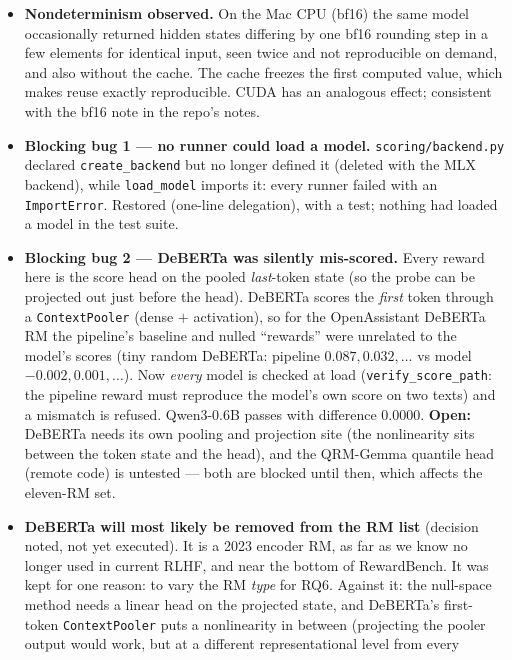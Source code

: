 \documentclass{article}
\begin{document}
\begin{itemize}
        removed, so every swept cell re-ran the model 5 more times.
  \item \textbf{Nondeterminism observed.} On the Mac CPU (bf16) the same model occasionally returned hidden
        states differing by one bf16 rounding step in a few elements for identical input, seen twice and not
        reproducible on demand, and also without the cache. The cache freezes the first computed value, which
        makes reuse exactly reproducible. CUDA has an analogous effect; consistent with the bf16 note in the
        repo's notes.
  \item \textbf{Blocking bug 1 --- no runner could load a model.} \texttt{scoring/backend.py} declared
        \texttt{create\_backend} but no longer defined it (deleted with the MLX backend), while
        \texttt{load\_model} imports it: every runner failed with an \texttt{ImportError}. Restored (one-line
        delegation), with a test; nothing had loaded a model in the test suite.
  \item \textbf{Blocking bug 2 --- DeBERTa was silently mis-scored.} Every reward here is the score head on the
        pooled \emph{last}-token state (so the probe can be projected out just before the head). DeBERTa scores
        the \emph{first} token through a \texttt{ContextPooler} (dense $+$ activation), so for the
        OpenAssistant DeBERTa RM the pipeline's baseline and nulled ``rewards'' were unrelated to the model's
        scores (tiny random DeBERTa: pipeline $0.087, 0.032, \dots$ vs model $-0.002, 0.001, \dots$). Now
        \emph{every} model is checked at load (\texttt{verify\_score\_path}: the pipeline reward must reproduce
        the model's own score on two texts) and a mismatch is refused. Qwen3-0.6B passes with difference
        0.0000. \textbf{Open:} DeBERTa needs its own pooling and projection site (the nonlinearity sits between
        the token state and the head), and the QRM-Gemma quantile head (remote code) is untested --- both are
        blocked until then, which affects the eleven-RM set.
  \item \textbf{DeBERTa will most likely be removed from the RM list} (decision noted, not yet executed). It is a
        2023 encoder RM, as far as we know no longer used in current RLHF, and near the bottom of RewardBench. It
        was kept for one reason: to vary the RM \emph{type} for RQ6. Against it: the null-space method needs a
        linear head on the projected state, and DeBERTa's first-token \texttt{ContextPooler} puts a nonlinearity in
        between (projecting the pooler output would work, but at a different representational level from every

\end{itemize}
\end{document}
